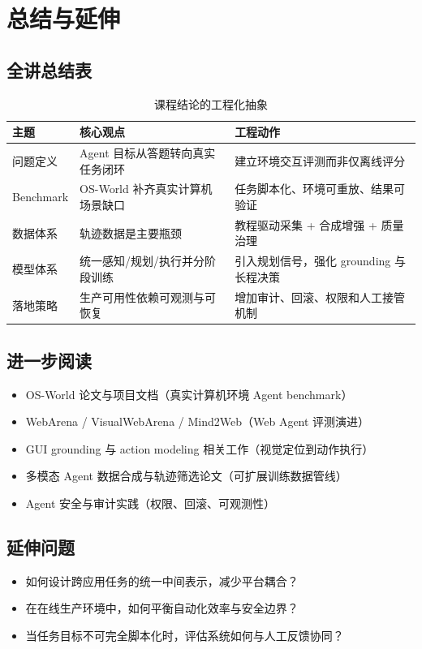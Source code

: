 \documentclass[a4paper]{article}
\begin{document}
\section{总结与延伸}

\subsection{全讲总结表}
\begin{table}[H]
\centering
\begin{tabular}{p{3.0cm}p{4.6cm}p{4.0cm}}
\toprule
\textbf{主题} & \textbf{核心观点} & \textbf{工程动作} \\
\midrule
问题定义 & Agent 目标从答题转向真实任务闭环 & 建立环境交互评测而非仅离线评分 \\
Benchmark & OS-World 补齐真实计算机场景缺口 & 任务脚本化、环境可重放、结果可验证 \\
数据体系 & 轨迹数据是主要瓶颈 & 教程驱动采集 + 合成增强 + 质量治理 \\
模型体系 & 统一感知/规划/执行并分阶段训练 & 引入规划信号，强化 grounding 与长程决策 \\
落地策略 & 生产可用性依赖可观测与可恢复 & 增加审计、回滚、权限和人工接管机制 \\
\bottomrule
\end{tabular}
\caption{课程结论的工程化抽象}
\end{table}

\subsection{进一步阅读}
\begin{itemize}
    \item OS-World 论文与项目文档（真实计算机环境 Agent benchmark）
    \item WebArena / VisualWebArena / Mind2Web（Web Agent 评测演进）
    \item GUI grounding 与 action modeling 相关工作（视觉定位到动作执行）
    \item 多模态 Agent 数据合成与轨迹筛选论文（可扩展训练数据管线）
    \item Agent 安全与审计实践（权限、回滚、可观测性）
\end{itemize}

\subsection{延伸问题}
\begin{itemize}
    \item 如何设计跨应用任务的统一中间表示，减少平台耦合？
    \item 在在线生产环境中，如何平衡自动化效率与安全边界？
    \item 当任务目标不可完全脚本化时，评估系统如何与人工反馈协同？
\end{itemize}
\end{document}
